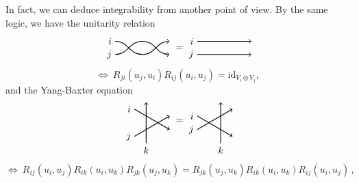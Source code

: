 In fact, we can deduce integrability from another point of view. By
the same logic, we have the unitarity relation 
\begin{equation}
    \begin{tikzpicture}[yscale=0.6, baseline=(x.base)]
        \node (x) at (0,0) {\vphantom{x}};
        
        \draw[thick, ->] (0,0.4) node[left] {$i$} to[out=0, in=180] (1,-0.4) to [out=0, in=180] (2,0.4);
        \draw[thick, ->] (0,-0.4) node[left] {$j$} to[out=0, in=180] (1,0.4) to [out=0, in=180] (2,-0.4);
        
    \end{tikzpicture}
  \ =
    \begin{tikzpicture}[yscale=0.6, baseline=(x.base)]
        \node (x) at (0,0) {\vphantom{x}};
        
        \draw[thick, ->] (0,0.4) node[left] {$i$} -- (2,0.4);
        \draw[thick, ->] (0,-0.4) node[left] {$j$} -- (2,-0.4);
        
    \end{tikzpicture}
\end{equation}
\begin{equation}
   \Longleftrightarrow ~ R_{ji}\left(u_{j},u_{i}\right)R_{ij}\left(u_{i},u_{j}\right)  =  \mathrm{id}_{V_{i}\otimes V_{j}},
\end{equation}
 and the Yang-Baxter equation
\begin{equation}
    \begin{tikzpicture}[scale=0.5, baseline=(x.base)]
        \node (x) at (30:2) {};
        
        \draw[thick, ->] (0,0) node[left] {$j$} -- ++(30:3);
        \draw[thick, ->] (0,2) node[left] {$i$} -- ++(-30:3);
        \draw[thick, ->] (-30:1) node[below] {$k$} -- ++(0,3);
        
    \end{tikzpicture}
  \ = 
    \begin{tikzpicture}[scale=0.5, baseline=(x.base)]
        \node (x) at (30:1) {};
        
        \draw[thick, ->] (0,0) node[left] {$j$} -- ++(30:3);
        \draw[thick, ->] (0,1) node[left] {$i$} -- ++(-30:3);
        \draw[thick, ->] (-30:2) node[below] {$k$} -- ++(0,3);
        
    \end{tikzpicture}
\end{equation}
\begin{equation}
   \Longleftrightarrow ~ R_{ij}\left(u_{i},u_{j}\right)R_{ik}\left(u_{i},u_{k}\right)R_{jk}\left(u_{j},u_{k}\right)  
    =  R_{jk}\left(u_{j},u_{k}\right)R_{ik}\left(u_{i},u_{k}\right)R_{ij}\left(u_{i},u_{j}\right) \, ,
\end{equation}
